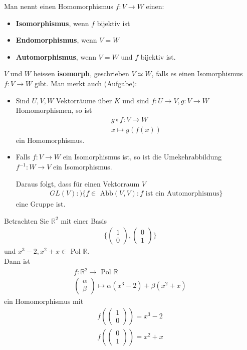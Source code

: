 \documentclass[11pt]{report}
\newcommand*\Zb[1] {\mathbb{#1}}
\newcommand*\f[1] {\textbf{#1}}
\begin{document}
Man nennt einen Homomorphismus $f: V \rightarrow W$ einen: 
\begin{itemize}
 \item \f{Isomorphismus}, wenn $f$ bijektiv ist
 \item \f{Endomorphismus}, wenn $V=W$
\item \f{Automorphismus}, wenn $V=W$ und $f$ bijektiv ist.
\end{itemize}
$V$ und $W$ heissen \f{isomorph}, geschrieben $V \simeq W$, falls es einen Isomorphismus $f: V \rightarrow W$ gibt.
Man merkt auch (Aufgabe):
\begin{itemize}
 \item Sind $U,V,W$ Vektorräume über $K$ und sind $f: U \rightarrow V, g: V \rightarrow W$ Homomorphismen, so ist
\begin{align}
 g \circ f: V \rightarrow W \\
x \mapsto g(f(x))
\end{align}
ein Homomorphismus.
\item Falls $f: V \rightarrow W$ ein Isomorphismus ist, so ist die Umekehrabbildung $f^{-1}: W \rightarrow V$ ein Isomorphismus.

Daraus folgt, dass für einen Vektorraum $V$
\begin{align}
 GL(V) :) \{f \in \text{ Abb}(V,V): f\text{ ist ein Automorphismus}\}
\end{align}
eine Gruppe ist.
\end{itemize}
Betrachten Sie $\Zb{R}^2$ mit einer Basis 
\begin{align}
\{\begin{pmatrix} 1 \\ 0 \end{pmatrix}, \begin{pmatrix} 0 \\ 1 \end{pmatrix}\}
\end{align}
und $x^3-2, x^2+x \in $ Pol $\Zb{R}$.\\
Dann ist 
\begin{align}
 f: \Zb{R}^2 \rightarrow \text{ Pol } \Zb{R} \\
\begin{pmatrix} \alpha \\ \beta \end{pmatrix} \mapsto \alpha(x^3-2) + \beta(x^2 +x)
\end{align}
ein Homomorphismus mit 
\begin{align}
f(\begin{pmatrix} 1 \\ 0 \end{pmatrix}) = x^3 -2 \\
f(\begin{pmatrix} 0 \\ 1 \end{pmatrix}) = x^2 + x 
\end{align}
\end{document}
